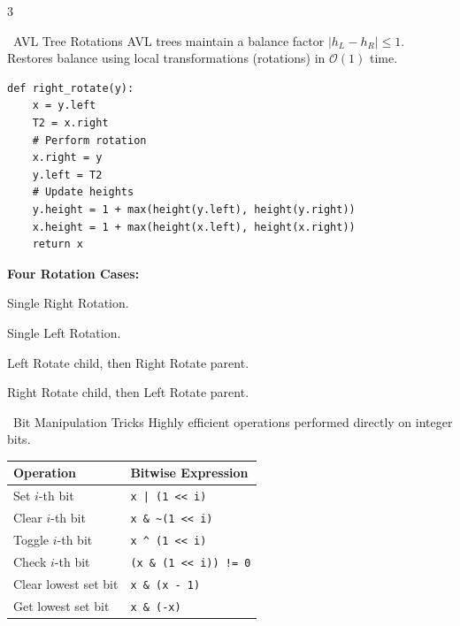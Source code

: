 \documentclass[10pt,landscape,letterpaper]{article}
\begin{document}
\begin{multicols*}{3}
\begin{topicbox}{\faTree~AVL Tree Rotations}
  \scriptsize
  AVL trees maintain a balance factor $|h_L - h_R| \le 1$. Restores balance using local transformations (rotations) in $\mathcal{O}(1)$ time.
  \vspace{2pt}
  \begin{lstlisting}
def right_rotate(y):
    x = y.left
    T2 = x.right
    # Perform rotation
    x.right = y
    y.left = T2
    # Update heights
    y.height = 1 + max(height(y.left), height(y.right))
    x.height = 1 + max(height(x.left), height(x.right))
    return x
  \end{lstlisting}
  \vspace{2pt}
  \textbf{Four Rotation Cases:}
  \begin{description}[leftmargin=3pt,itemsep=1pt,topsep=1pt,parsep=0pt]
    \item[\color{primary}Left-Left (LL):] Single Right Rotation.
    \item[\color{primary}Right-Right (RR):] Single Left Rotation.
    \item[\color{primary}Left-Right (LR):] Left Rotate child, then Right Rotate parent.
    \item[\color{primary}Right-Left (RL):] Right Rotate child, then Left Rotate parent.
  \end{description}
\end{topicbox}

\begin{accentbox}{\faMicrochip~Bit Manipulation Tricks}
  \scriptsize
  Highly efficient operations performed directly on integer bits.
  \vspace{3pt}
  \renewcommand{\arraystretch}{1.1}
  \begin{tabularx}{\linewidth}{@{} l@{\hspace{4mm}} X @{}}
    \toprule
    \textbf{Operation} & \textbf{Bitwise Expression} \\
    \midrule
    Set $i$-th bit & \texttt{x | (1 << i)} \\
    Clear $i$-th bit & \texttt{x \& \textasciitilde(1 << i)} \\
    Toggle $i$-th bit & \texttt{x \^{} (1 << i)} \\
    Check $i$-th bit & \texttt{(x \& (1 << i)) != 0} \\
    Clear lowest set bit & \texttt{x \& (x - 1)} \\
    Get lowest set bit & \texttt{x \& (-x)} \\
    \bottomrule
  \end{tabularx}
\end{accentbox}

\end{multicols*}
\end{document}
